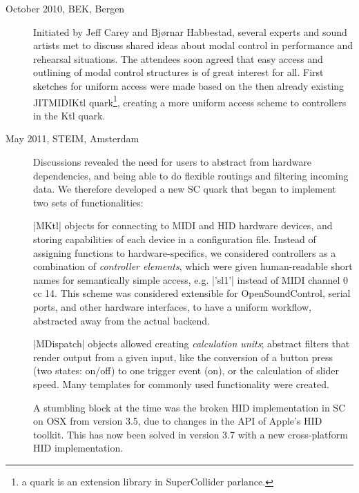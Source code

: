 \documentclass{article}
\newcommand{\todo}[1] {\emph{\textbf{TODO:} #1}}
\begin{document}
\begin{description}
	\item[October 2010, BEK, Bergen] Initiated by Jeff Carey and Bj\o{}rnar Habbestad, several experts and sound artists met to discuss shared ideas about modal control in performance and rehearsal situations.
	The attendees soon agreed that easy access and outlining of modal control structures is of great interest for all. First sketches for uniform access were made based on the then already existing JITMIDIKtl quark\footnote{a quark is an extension library in SuperCollider parlance.}, creating a more uniform access scheme to controllers in the Ktl quark. 
	
	
	\item[May 2011, STEIM, Amsterdam] Discussions revealed the need for users to abstract from hardware dependencies, and being able to do flexible routings and filtering incoming data. We therefore developed a new SC quark that began to implement two sets of functionalities:

|MKtl| objects for connecting to MIDI and HID hardware devices, and storing capabilities of each device in a configuration file. 
Instead of assigning functions to hardware-specifics, we considered controllers as a combination of \emph{controller elements}, which were given human-readable short names for semantically simple access, e.g. |'sl1'| instead of MIDI channel 0 cc 14.
This scheme was considered extensible for OpenSoundControl, serial ports, and other hardware interfaces, to have a uniform workflow, abstracted away from the actual backend.

|MDispatch| objects allowed creating \emph{calculation units}; abstract filters that render output from a given input, like the conversion of a button press (two states: on/off) to one trigger event (on), or the calculation of slider speed. Many templates for commonly used functionality were created.

A stumbling block at the time was the broken HID implementation in SC on OSX from version 3.5, due to changes in the API of Apple's HID toolkit. This has now been solved in version 3.7 with a new cross-platform HID implementation.


\end{description}
\end{document}
